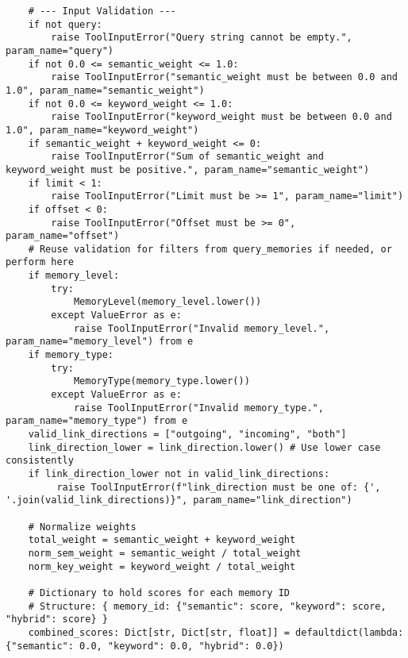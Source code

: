 \documentclass[12pt,a4paper]{article}
\begin{document}
\begin{pageablecode}
\begin{verbatim}
    # --- Input Validation ---
    if not query:
        raise ToolInputError("Query string cannot be empty.", param_name="query")
    if not 0.0 <= semantic_weight <= 1.0:
        raise ToolInputError("semantic_weight must be between 0.0 and 1.0", param_name="semantic_weight")
    if not 0.0 <= keyword_weight <= 1.0:
        raise ToolInputError("keyword_weight must be between 0.0 and 1.0", param_name="keyword_weight")
    if semantic_weight + keyword_weight <= 0:
        raise ToolInputError("Sum of semantic_weight and keyword_weight must be positive.", param_name="semantic_weight")
    if limit < 1:
        raise ToolInputError("Limit must be >= 1", param_name="limit")
    if offset < 0:
        raise ToolInputError("Offset must be >= 0", param_name="offset")
    # Reuse validation for filters from query_memories if needed, or perform here
    if memory_level:
        try:
            MemoryLevel(memory_level.lower())
        except ValueError as e:
            raise ToolInputError("Invalid memory_level.", param_name="memory_level") from e
    if memory_type:
        try:
            MemoryType(memory_type.lower())
        except ValueError as e:
            raise ToolInputError("Invalid memory_type.", param_name="memory_type") from e
    valid_link_directions = ["outgoing", "incoming", "both"]
    link_direction_lower = link_direction.lower() # Use lower case consistently
    if link_direction_lower not in valid_link_directions:
         raise ToolInputError(f"link_direction must be one of: {', '.join(valid_link_directions)}", param_name="link_direction")

    # Normalize weights
    total_weight = semantic_weight + keyword_weight
    norm_sem_weight = semantic_weight / total_weight
    norm_key_weight = keyword_weight / total_weight

    # Dictionary to hold scores for each memory ID
    # Structure: { memory_id: {"semantic": score, "keyword": score, "hybrid": score} }
    combined_scores: Dict[str, Dict[str, float]] = defaultdict(lambda: {"semantic": 0.0, "keyword": 0.0, "hybrid": 0.0})


\end{verbatim}
\end{pageablecode}
\end{document}
